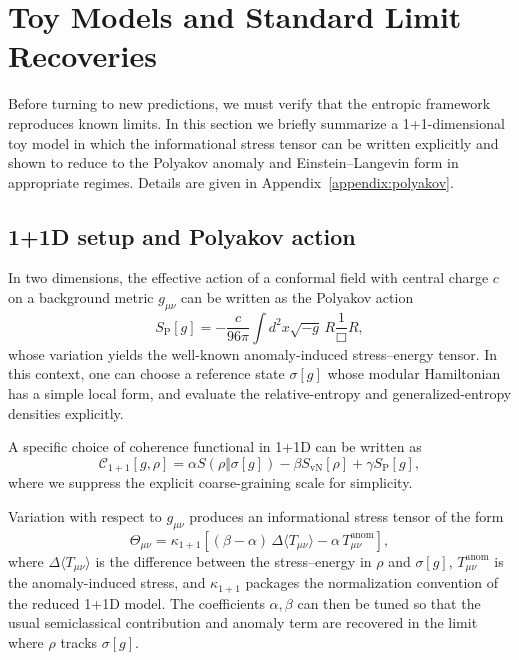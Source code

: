 \documentclass[aps,prd,twocolumn,superscriptaddress,nofootinbib,floatfix]{revtex4-2}
\newcommand{\Cfunc}{\mathcal{C}}
\newcommand{\Tmn}{\Theta_{\mu\nu}}
\begin{document}
\section{Toy Models and Standard Limit Recoveries}
\label{sec:toy}

Before turning to new predictions, we must verify that the entropic framework reproduces known limits.
In this section we briefly summarize a 1+1-dimensional toy model in which the informational stress tensor can be written explicitly and shown to reduce to the Polyakov anomaly and Einstein--Langevin form in appropriate regimes.
Details are given in Appendix~\ref{appendix:polyakov}.

\subsection{1+1D setup and Polyakov action}

In two dimensions, the effective action of a conformal field with central charge $c$ on a background metric $g_{\mu\nu}$ can be written as the Polyakov action~\cite{Polyakov1981}
\begin{equation}
    S_{\mathrm{P}}[g]
    = -\frac{c}{96\pi}\int d^2x \sqrt{-g}\, R\frac{1}{\Box}R,
    \label{eq:polyakov}
\end{equation}
whose variation yields the well-known anomaly-induced stress--energy tensor.
In this context, one can choose a reference state $\sigma[g]$ whose modular Hamiltonian has a simple local form, and evaluate the relative-entropy and generalized-entropy densities explicitly.

A specific choice of coherence functional in 1+1D can be written as
\begin{equation}
    \Cfunc_{1+1}[g,\rho]
    =
    \alpha S(\rho\Vert\sigma[g])
    - \beta S_{\mathrm{vN}}[\rho]
    + \gamma S_{\mathrm{P}}[g],
    \label{eq:C-1+1}
\end{equation}
where we suppress the explicit coarse-graining scale for simplicity.

Variation with respect to $g_{\mu\nu}$ produces an informational stress tensor of the form
\begin{equation}
    \Tmn
    =
    \kappa_{1+1}\!\left[
    (\beta-\alpha)\,\Delta\!\langle T_{\mu\nu}\rangle
    - \alpha\,T^{\mathrm{anom}}_{\mu\nu}\right],
    \label{eq:theta-1+1}
\end{equation}
where $\Delta\!\langle T_{\mu\nu}\rangle$ is the difference between the stress--energy in $\rho$ and $\sigma[g]$, $T^{\mathrm{anom}}_{\mu\nu}$ is the anomaly-induced stress, and $\kappa_{1+1}$ packages the normalization convention of the reduced 1+1D model. The coefficients $\alpha,\beta$ can then be tuned so that the usual semiclassical contribution and anomaly term are recovered in the limit where $\rho$ tracks $\sigma[g]$.
\end{document}
